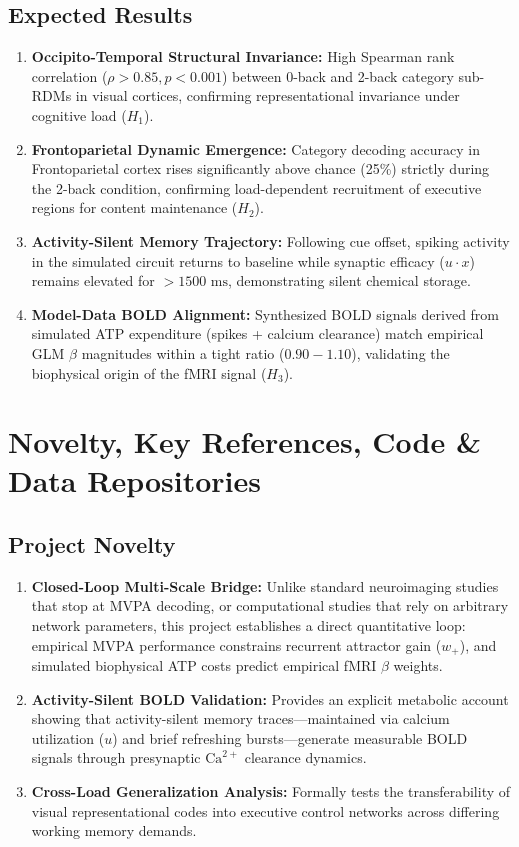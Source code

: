 \documentclass[11pt,a4paper]{article}
\begin{document}
\subsection{Expected Results}

\begin{enumerate}
    \item \textbf{Occipito-Temporal Structural Invariance:} High Spearman rank correlation ($\rho > 0.85, p < 0.001$) between 0-back and 2-back category sub-RDMs in visual cortices, confirming representational invariance under cognitive load ($H_1$).
    \item \textbf{Frontoparietal Dynamic Emergence:} Category decoding accuracy in Frontoparietal cortex rises significantly above chance (25\%) strictly during the 2-back condition, confirming load-dependent recruitment of executive regions for content maintenance ($H_2$).
    \item \textbf{Activity-Silent Memory Trajectory:} Following cue offset, spiking activity in the simulated circuit returns to baseline while synaptic efficacy ($u \cdot x$) remains elevated for $>1500\text{ ms}$, demonstrating silent chemical storage.
    \item \textbf{Model-Data BOLD Alignment:} Synthesized BOLD signals derived from simulated ATP expenditure (spikes + calcium clearance) match empirical GLM $\beta$ magnitudes within a tight ratio ($0.90 - 1.10$), validating the biophysical origin of the fMRI signal ($H_3$).
\end{enumerate}

\section{Novelty, Key References, Code \& Data Repositories}

\subsection{Project Novelty}

\begin{enumerate}
    \item \textbf{Closed-Loop Multi-Scale Bridge:} Unlike standard neuroimaging studies that stop at MVPA decoding, or computational studies that rely on arbitrary network parameters, this project establishes a direct quantitative loop: empirical MVPA performance constrains recurrent attractor gain ($w_+$), and simulated biophysical ATP costs predict empirical fMRI $\beta$ weights.
    \item \textbf{Activity-Silent BOLD Validation:} Provides an explicit metabolic account showing that activity-silent memory traces---maintained via calcium utilization ($u$) and brief refreshing bursts---generate measurable BOLD signals through presynaptic $\text{Ca}^{2+}$ clearance dynamics.
    \item \textbf{Cross-Load Generalization Analysis:} Formally tests the transferability of visual representational codes into executive control networks across differing working memory demands.
\end{enumerate}
\end{document}
